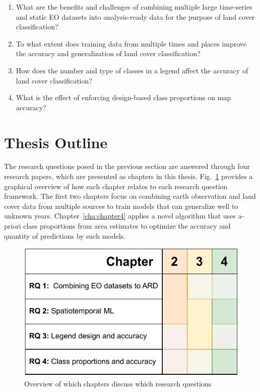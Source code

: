 \begin{enumerate}
\item %
What are the benefits and challenges of combining multiple large time-series and static EO datasets into analysis-ready data for the purpose of land cover classification?
\item %
To what extent does training data from multiple times and places improve the accuracy and generalization of land cover classification?
\item %
How does the number and type of classes in a legend affect the accuracy of land cover classification?
\item %
What is the effect of enforcing design-based class proportions on map accuracy?
\end{enumerate}

\section{Thesis Outline}

The research questions posed in the previous section are answered through four research papers, which are presented as chapters in this thesis. Fig.\@~\ref{fig:01_rqs_chapters} provides a graphical overview of how each chapter relates to each research question framework. The first two chapters focus on combining earth observation and land cover data from multiple sources to train models that can generalize well to unknown years. Chapter\@~\ref{cha:chapter4} applies a novel algorithm that uses a-priori class proportions from area estimates to optimize the accuracy and quantity of predictions by such models.

\begin{figure}[H]
    \centering
    \includegraphics[width=.55\textwidth]{figs_01/fig_rqs_chapters.pdf}
    \caption{Overview of which chapters discuss which research questions}
    \label{fig:01_rqs_chapters}
\end{figure}

